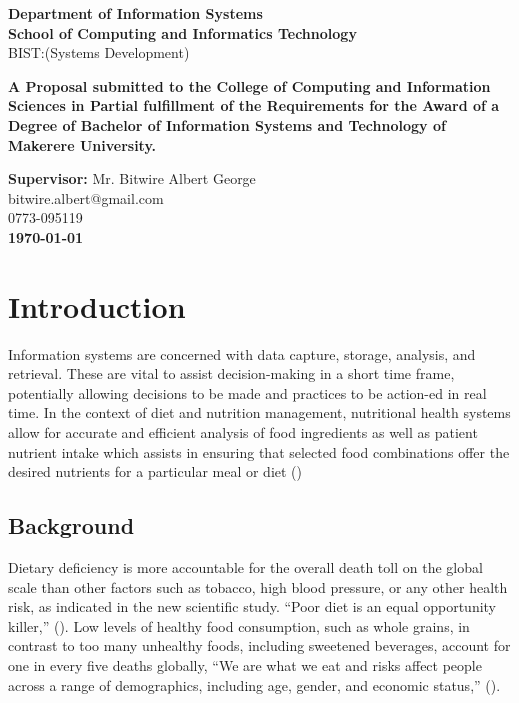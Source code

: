 \documentclass{article}
\begin{document}
\begin{center}
\begin{center}
\textbf{Department of Information Systems}\\
\textbf{School of Computing and Informatics Technology}
\\ BIST:(Systems Development)
\end{center}

\begin{center}
\textbf{A Proposal submitted to the College of Computing and Information Sciences in Partial fulfillment of the Requirements for the Award of a Degree of Bachelor of Information Systems and Technology of Makerere University.}
\end{center}

\vspace{3pt} 
\textbf{Supervisor:} Mr. Bitwire Albert George \\
 bitwire.albert@gmail.com \\ 0773-095119 \\

\vspace{25pt} 
\textbf{\today}
\end{center}

\newpage
\tableofcontents
\newpage
\listoftables
\newpage
\listoffigures
\newpage

\section{Introduction}
\label{Introducion}
Information systems are concerned with data capture, storage, analysis, and retrieval. These are vital to assist decision-making in a short time frame, potentially allowing decisions to be made and practices to be action-ed in real time.  In the context of diet and nutrition management, nutritional health systems allow for accurate and efficient analysis of food ingredients as well as patient nutrient intake which assists in ensuring that selected food combinations offer the desired nutrients for a particular meal or diet (\cite{DFM})


\subsection{Background}
\label{Background}
Dietary deficiency is more accountable for the overall death toll on the global scale than other factors such as tobacco, high blood pressure, or any other health risk, as indicated in the new scientific study. “Poor diet is an equal opportunity killer,” (\cite{ihme2019new}). Low levels of healthy food consumption, such as whole grains, in contrast to too many unhealthy foods, including sweetened beverages, account for one in every five deaths globally, “We are what we eat and risks affect people across a range of demographics, including age, gender, and economic status,” (\cite{ihme2019new}).
\end{document}
